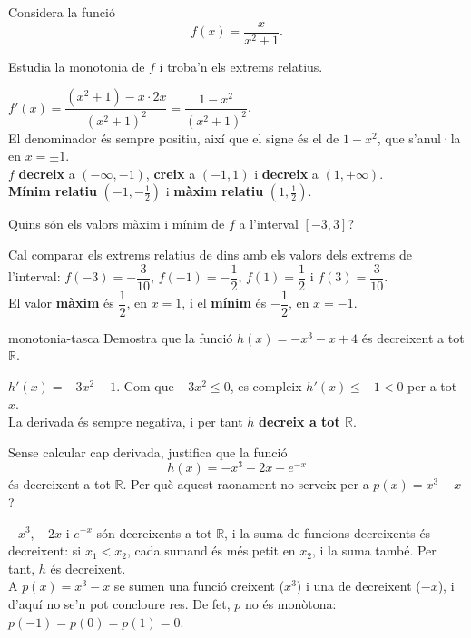 Considera la funció
\[
f(x)=\frac{x}{x^2+1} .
\]

\begin{apartats}

Estudia la monotonia de $f$ i troba'n els extrems relatius.

\begin{solucio}
$f'(x)=\dfrac{\left(x^2+1\right)-x\cdot2x}{\left(x^2+1\right)^2}=\dfrac{1-x^2}{\left(x^2+1\right)^2}$.\\
El denominador és sempre positiu, així que el signe és el de $1-x^2$, que s'anul·la en
$x=\pm1$.\\
$f$ \textbf{decreix} a $(-\infty,-1)$, \textbf{creix} a $(-1,1)$ i \textbf{decreix} a
$(1,+\infty)$.\\
\textbf{Mínim relatiu} $\left(-1,-\tfrac12\right)$ i \textbf{màxim relatiu}
$\left(1,\tfrac12\right)$.
\end{solucio}

\begin{nomesllarg}
Quins són els valors màxim i mínim de $f$ a l'interval $[-3,3]$?

\begin{solucio}
Cal comparar els extrems relatius de dins amb els valors dels extrems de l'interval:
$f(-3)=-\dfrac{3}{10}$, $f(-1)=-\dfrac12$, $f(1)=\dfrac12$ i $f(3)=\dfrac{3}{10}$.\\
El valor \textbf{màxim} és $\dfrac12$, en $x=1$, i el \textbf{mínim} és $-\dfrac12$, en
$x=-1$.
\end{solucio}
\end{nomesllarg}

\begin{tria}{monotonia-tasca}
Demostra que la funció $h(x)=-x^3-x+4$ és decreixent a tot $\mathbb{R}$.

\begin{solucio}
$h'(x)=-3x^2-1$. Com que $-3x^2\le0$, es compleix $h'(x)\le-1<0$ per a tot $x$.\\
La derivada és sempre negativa, i per tant $h$ \textbf{decreix a tot $\mathbb{R}$}.
\end{solucio}

Sense calcular cap derivada, justifica que la funció
\[
h(x)=-x^3-2x+e^{-x}
\]
és decreixent a tot $\mathbb{R}$. Per què aquest raonament no serveix per a $p(x)=x^3-x$?

\begin{solucio}
$-x^3$, $-2x$ i $e^{-x}$ són decreixents a tot $\mathbb{R}$, i la suma de funcions decreixents és
decreixent: si $x_1<x_2$, cada sumand és més petit en $x_2$, i la suma també. Per tant, $h$ és
decreixent.\\
A $p(x)=x^3-x$ se sumen una funció creixent ($x^3$) i una de decreixent ($-x$), i d'aquí no se'n
pot concloure res. De fet, $p$ no és monòtona: $p(-1)=p(0)=p(1)=0$.
\end{solucio}
\end{tria}

\end{apartats}
